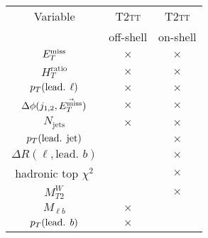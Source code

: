         \begin{table}[h!]
            \begin{center}
                \begin{tabular}{|c|cc|}

                    \hline
                    Variable                            & \textsc{T2tt} & \textsc{T2tt} \\
                                                        & off-shell     & on-shell      \\
                    \hline
                    $E_T^\text{miss}$                              & $\times$      & $\times$      \\
                    $H_{T}^\text{ratio}$                & $\times$      & $\times$      \\
                    $p_T(\text{lead. } \ell)$           & $\times$      & $\times$      \\
                    $\Delta\phi(j_{1,2},\vec{E_T^\text{miss}})$    & $\times$      & $\times$      \\
                    $N_\text{jets}$                     & $\times$      & $\times$      \\
                    $p_T(\text{lead. jet})$             &               & $\times$      \\
                    $\Delta R( \ell, \text{lead. } b)$  &               & $\times$      \\
                    hadronic top $\chi^2$               &               & $\times$      \\
                    $M_{T2}^W$                          &               & $\times$      \\
                    $M_{\ell b}$                        & $\times$      &               \\
                    $p_T(\text{lead. } b)$              & $\times$      &               \\
                    \hline
                \end{tabular}
                \begin{tabular}{|c|ccc|}


\end{tabular}
\end{center}
\end{table}
